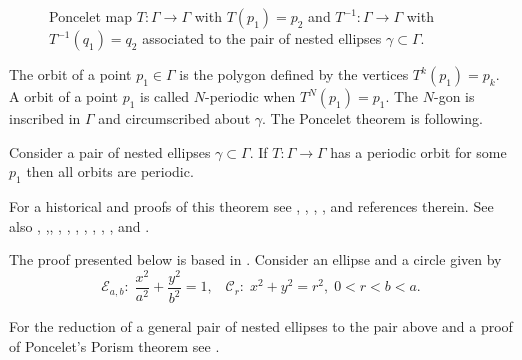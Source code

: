 \begin{figure}[H]
	\begin{center}
		\def\svgwidth{1.0\textwidth}
		
		\caption {Poncelet map  $T:\Gamma\to\Gamma$ with $T(p_1)=p_2$ and $T^{-1}:\Gamma\to\Gamma$ with $T^{-1}(q_1)=q_2$ associated to  the pair of nested ellipses $\gamma\subset\Gamma$.
		\label{fig:poncelet-map}}
	\end{center}
\end{figure}

The orbit of a point $p_1\in \Gamma$ is the polygon defined by the vertices $T^k(p_1)=p_k.$ 
A orbit of a point $p_1$ is called $N$-periodic when $T^N(p_1)=p_1.$ The $N$-gon is inscribed in $\Gamma$
and circumscribed about $\gamma.$
The Poncelet theorem is following.
\begin{theorem} Consider a pair of nested ellipses $\gamma\subset \Gamma$. If $T:\Gamma\to\Gamma$ has a periodic orbit for some $p_1$ then all orbits are periodic. 
\end{theorem}
%
For a historical and proofs of this theorem see \cite{barth1996}, \cite{centina2016a}, \cite{centina2016b}, \cite{chasles1843}, \cite{drag2014} and references therein. See also    \cite[Chapter IV]{berger2010},  \cite{cima2010},\cite{cieslak2016}, \cite[Livre III, Chapitres II, III]{darboux1917}, \cite{drag_milena2011},  \cite[Chapter 9]{gla2016}, \cite{hahu2015}, \cite{hahu2017}, \cite{leb1921},  \cite{mirman2012},  \cite{poncelet1822} and \cite{previ1999}.

The proof presented below  is based in \cite{shoe1983}. 
Consider an ellipse and a circle given by
\[\mathcal{E}_{a,b}: \;\frac{x^2}{a^2}+\frac{y^2}{b^2}=1, \;\;\; \mathcal{C}_r:\; x^2+y^2=r^2, \; 0<r<b<a.\]

For the reduction of a general pair of nested ellipses to the pair above and a proof of Poncelet's Porism theorem   see \cite{bry}.

